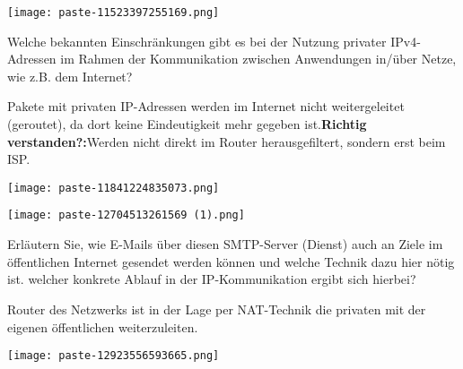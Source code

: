 \documentclass{article}
\begin{document}
\begin{tcolorbox}[colback=white!10!white,colframe=lightgray!75!black,
  savelowerto=\jobname_ex.tex,breakable,enhanced,lines before break=40]

\justifying
\begin{center}
\texttt{[image: paste-11523397255169.png]}
\end{center}
Welche bekannten Einschränkungen gibt es bei der Nutzung privater IPv4-Adressen im Rahmen der Kommunikation zwischen Anwendungen in/über Netze, wie z.B. dem Internet?

\tcblower

\justifying
Pakete mit privaten IP-Adressen werden im Internet nicht weitergeleitet (geroutet), da dort keine Eindeutigkeit mehr gegeben ist.\textbf{Richtig verstanden?:}Werden nicht direkt im Router herausgefiltert, sondern erst beim ISP.\textbf{}\begin{center}
\texttt{[image: paste-11841224835073.png]}
\end{center}

\end{tcolorbox}
\begin{tcolorbox}[colback=white!10!white,colframe=lightgray!75!black,
  savelowerto=\jobname_ex.tex,breakable,enhanced,lines before break=40]

\justifying
\begin{center}
\texttt{[image: paste-12704513261569 (1).png]}
\end{center}
Erläutern Sie, wie E-Mails über diesen SMTP-Server (Dienst) auch an Ziele im öffentlichen Internet gesendet werden können und welche Technik dazu hier nötig ist. welcher konkrete Ablauf in der IP-Kommunikation ergibt sich hierbei?

\tcblower

\justifying
Router des Netzwerks ist in der Lage per NAT-Technik die privaten mit der eigenen öffentlichen weiterzuleiten.\begin{center}
\texttt{[image: paste-12923556593665.png]}
\end{center}

\end{tcolorbox}
\end{document}
